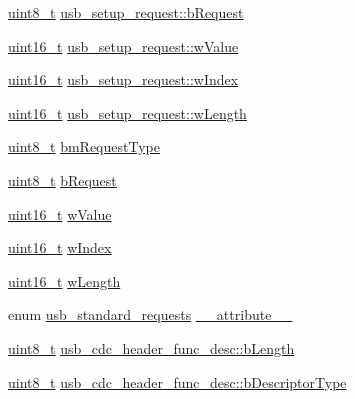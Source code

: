 \begin{DoxyCompactItemize}
\hyperlink{stdint_8h_aba7bc1797add20fe3efdf37ced1182c5}{uint8\-\_\-t} \hyperlink{group___p_i_o_s___u_s_b___d_e_f_s_ga55cbbe5ea2f7842c4df02bda43532cb5}{usb\-\_\-setup\-\_\-request\-::b\-Request}
\item 
\hyperlink{stdint_8h_a273cf69d639a59973b6019625df33e30}{uint16\-\_\-t} \hyperlink{group___p_i_o_s___u_s_b___d_e_f_s_ga1f14de3d7b02c5e6ba04cf9334e0d259}{usb\-\_\-setup\-\_\-request\-::w\-Value}
\item 
\hyperlink{stdint_8h_a273cf69d639a59973b6019625df33e30}{uint16\-\_\-t} \hyperlink{group___p_i_o_s___u_s_b___d_e_f_s_ga1469080fa91077cdc69a2f4dd5509974}{usb\-\_\-setup\-\_\-request\-::w\-Index}
\item 
\hyperlink{stdint_8h_a273cf69d639a59973b6019625df33e30}{uint16\-\_\-t} \hyperlink{group___p_i_o_s___u_s_b___d_e_f_s_gae0ab089c03a957e9e3a61874d5565d44}{usb\-\_\-setup\-\_\-request\-::w\-Length}
\item 
\hyperlink{stdint_8h_aba7bc1797add20fe3efdf37ced1182c5}{uint8\-\_\-t} \hyperlink{group___p_i_o_s___u_s_b___d_e_f_s_gabea120ea756eb0abdb8aafb8713f61f4}{bm\-Request\-Type}
\item 
\hyperlink{stdint_8h_aba7bc1797add20fe3efdf37ced1182c5}{uint8\-\_\-t} \hyperlink{group___p_i_o_s___u_s_b___d_e_f_s_ga1e7be110861bd4ff75c86d5214f31543}{b\-Request}
\item 
\hyperlink{stdint_8h_a273cf69d639a59973b6019625df33e30}{uint16\-\_\-t} \hyperlink{group___p_i_o_s___u_s_b___d_e_f_s_ga7383d0165ad8eab48aa239c005199121}{w\-Value}
\item 
\hyperlink{stdint_8h_a273cf69d639a59973b6019625df33e30}{uint16\-\_\-t} \hyperlink{group___p_i_o_s___u_s_b___d_e_f_s_gadc578ce35d89d52deba61ee6f312f177}{w\-Index}
\item 
\hyperlink{stdint_8h_a273cf69d639a59973b6019625df33e30}{uint16\-\_\-t} \hyperlink{group___p_i_o_s___u_s_b___d_e_f_s_ga496c03443b177fd2e6c93616064d2934}{w\-Length}
\item 
enum \hyperlink{group___p_i_o_s___u_s_b___d_e_f_s_ga656cd9a1af7abe6ec812f6ee50b223f9}{usb\-\_\-standard\-\_\-requests} \hyperlink{group___p_i_o_s___u_s_b___d_e_f_s_ga09790ada76856d0562b9eef5d9637f6c}{\-\_\-\-\_\-attribute\-\_\-\-\_\-}
\item 
\hyperlink{stdint_8h_aba7bc1797add20fe3efdf37ced1182c5}{uint8\-\_\-t} \hyperlink{group___p_i_o_s___u_s_b___d_e_f_s_ga15e505dd53db0e081c58b58f3fcd1ae0}{usb\-\_\-cdc\-\_\-header\-\_\-func\-\_\-desc\-::b\-Length}
\item 
\hyperlink{stdint_8h_aba7bc1797add20fe3efdf37ced1182c5}{uint8\-\_\-t} \hyperlink{group___p_i_o_s___u_s_b___d_e_f_s_ga09d781c982c0be7203ec0922f818350d}{usb\-\_\-cdc\-\_\-header\-\_\-func\-\_\-desc\-::b\-Descriptor\-Type}

\end{DoxyCompactItemize}

